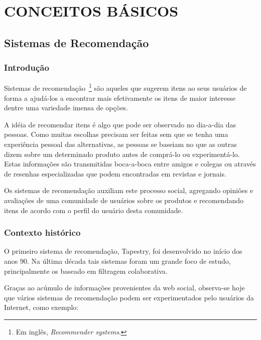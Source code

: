 \chapter{CONCEITOS BÁSICOS} %
\label{cha:conceitos_basicos}

\section{Sistemas de Recomendação}

\subsection{Introdução}
Sistemas de recomendação~\footnote{Em inglês, \textit{Recommender systems}.} são aqueles que sugerem itens ao seus usuários de forma a ajudá-los a encontrar mais efetivamente os itens de maior interesse dentre uma variedade imensa de opções.

A idéia de recomendar itens é algo que pode ser observado no dia-a-dia das pessoas. Como muitas escolhas precisam ser feitas sem que se tenha uma experiência pessoal das alternativas, as pessoas se baseiam no que as outras dizem sobre um determinado produto antes de comprá-lo ou experimentá-lo. Estas informações são transmitidas boca-a-boca entre amigos e colegas ou através de resenhas especializadas que podem encontradas em revistas e jornais.

Os sistemas de recomendação auxiliam este processo social, agregando opiniões e avaliações de uma comunidade de usuários sobre os produtos e recomendando itens de acordo com o perfil do usuário desta comunidade.

\subsection{Contexto histórico}
O primeiro sistema de recomendação, Tapestry\cite{Goldberg92}, foi desenvolvido no início dos anos 90. Na última década tais sistemas foram um grande foco de estudo, principalmente os baseado em filtragem colaborativa.~\cite{Resnick97}~\cite{Herlocker04}

Graças ao acúmulo de informações provenientes da web social, observa-se hoje que vários sistemas de recomendação podem ser experimentados pelo usuários da Internet, como exemplo:

